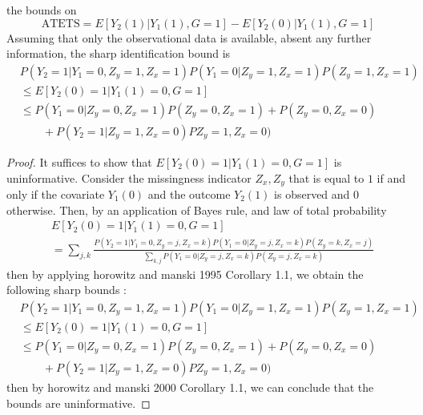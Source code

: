 \documentclass[uplatex,dvipdfmx]{jsarticle}
\begin{document}
\begin{theorem}\label{the:partial1}
    the bounds on
    \[\mathrm{ATETS} = E[ Y_2(1) | Y_1(1) , G =1 ] - E[ Y_2(0) | Y_1(1), G =1]\]
    Assuming that only the observational data is available, absent any further information, the sharp identification bound is 
    \begin{align}
        & P(Y_2 =1 | Y_1 =0, Z_y =1, Z_ x =1 ) P( Y_1 = 0 | Z_y =1, Z_x = 1 )P( Z_y = 1, Z_x =1)\\
        &\leq E[ Y_2(0)=1 | Y_1(1)=0, G=1] \\
        &\leq P( Y_1 = 0 | Z_y = 0 ,Z_x = 1) P( Z_y = 0 , Z_x =1 ) + P( Z_y = 0, Z _ x = 0) \\
        &\qquad+ P( Y_2 =1 | Z_y = 1, Z_ x =0) P  Z_ y =1, Z_x = 0)
    \end{align} 
\end{theorem}
\begin{proof}
    It suffices to show that $E[ Y_2(0) =1| Y_1(1)=0, G=1]$ is uninformative. Consider the missingness indicator $Z_x, Z_y$ that is equal to $1$ if and only if the covariate $Y_1(0)$ and the outcome $Y_2(1)$ is observed and $0$ otherwise. Then, by an application of Bayes rule, and law of total probability
    \begin{align}
    &E[ Y_2(0)=1 | Y_1(1)=0, G=1] \\
    &= \sum_{j,k} \frac{ P (Y_2 =1 | Y_1 = 0 , Z_y = j, Z_ x = k ) P ( Y_1 = 0 | Z_y =j,Z_ x =k ) P( Z_y = k, Z_x = j) }{ \sum_{ k, j} P( Y_1 = 0 | Z_y = j, Z_x = k ) P (Z_y = j, Z_x = k) }
    \end{align}
    then by applying %
    {horowitz and manski 1995} Corollary 1.1, we obtain the following sharp bounds :
    \begin{align}
    & P(Y_2 =1 | Y_1 =0, Z_y =1, Z_ x =1 ) P( Y_1 = 0 | Z_y =1, Z_x = 1 )P( Z_y = 1, Z_x =1)\\
    &\leq E[ Y_2(0)=1 | Y_1(1)=0, G=1] \\
    &\leq P( Y_1 = 0 | Z_y = 0 ,Z_x = 1) P( Z_y = 0 , Z_x =1 ) + P( Z_y = 0, Z _ x = 0) \\
    &\qquad+ P( Y_2 =1 | Z_y = 1, Z_ x =0) P  Z_ y =1, Z_x = 0)
    \end{align} 
    then by %
    {horowitz and manski 2000} Corollary 1.1, we can conclude that the bounds are uninformative.
\end{proof}
\end{document}
